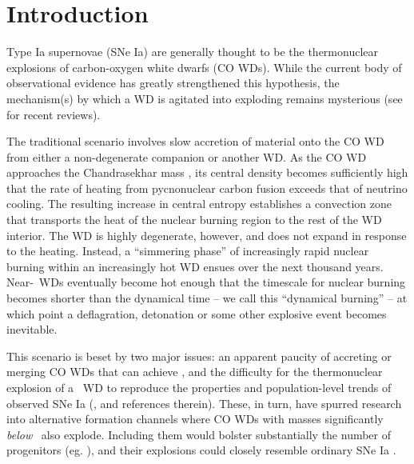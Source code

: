 \section{Introduction}
\label{sec:c5_intro}

Type Ia supernovae (SNe Ia) are generally thought to be the thermonuclear explosions of carbon-oxygen white dwarfs (CO WDs).  While the current body of observational evidence has greatly strengthened this hypothesis, the mechanism(s) by which a WD is agitated into exploding remains mysterious (see \citealt{howe11, hill+13, maozmn14} for recent reviews).  

The traditional scenario involves slow accretion of material onto the CO WD from either a non-degenerate companion or another WD.  As the CO WD approaches the Chandrasekhar mass \Mch, its central density becomes sufficiently high that the rate of heating from pycnonuclear carbon fusion exceeds that of neutrino cooling.  The resulting increase in central entropy establishes a convection zone that transports the heat of the nuclear burning region to the rest of the WD interior.  The WD is highly degenerate, however, and does not expand in response to the heating.  {\charles Instead, a ``simmering phase'' of increasingly rapid nuclear burning within an increasingly hot WD ensues over the next thousand years.  Near-\Mch\ WDs eventually become hot enough that the timescale for nuclear burning becomes shorter than the dynamical time -- we call this ``dynamical burning'' -- at which point a deflagration, detonation or some other explosive event} becomes inevitable.

This scenario is beset by two major issues: an apparent paucity of accreting or merging CO WDs that can achieve \Mch, and the difficulty for the thermonuclear explosion of a \Mch\ WD to reproduce the properties and population-level trends of observed SNe Ia (\citeal{vkercj10}, and references therein).  These, in turn, have spurred research into alternative formation channels where CO WDs with masses significantly \textit{below} \Mch\ also explode.  Including them would bolster substantially the number of progenitors (eg. \citealt{badem12}), and their explosions could closely resemble ordinary SNe Ia \citep{shig+92, sim+10}.

